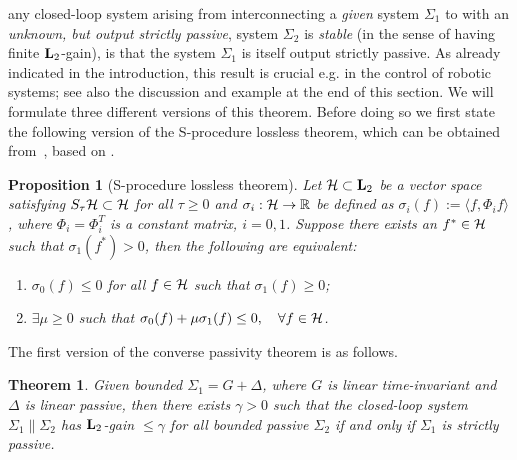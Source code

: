 \documentclass[11pt]{article}
\newtheorem{thm}[lemma]{Theorem}
\newtheorem{prop}[lemma]{Proposition}
\def\Real{\mathbb{R}} \def\Ints{\mathbb{Z}} \def\Natural{\mathbb{N}}
\newcommand{\Ltwo}{\boldsymbol{\rm L}_{2}}
\begin{document}
any closed-loop system arising from interconnecting a {\it given} system $\Sigma_1$ to with an {\it unknown, but output strictly passive}, system $\Sigma_2$ is {\it stable} (in the sense of having finite $\Ltwo$-gain), is that the system $\Sigma_1$ is itself output strictly passive. 
As already indicated in the introduction, this result is crucial e.g. in the control of robotic systems; see also the discussion and example at the end of this section.  We will formulate
three different versions of this theorem. Before doing so we first state the following version of the S-procedure lossless
theorem, which can be obtained from~\cite[Thm. 7 and Ex. 28]{Jon01}, based on \cite{MegTre93}.

\begin{prop}[S-procedure lossless theorem] \label{prop: Sprod} Let $\HH \subset \Ltwo$ be a vector space satisfying $S_\tau \mathcal{H} \subset \mathcal{H}$ for all
  $\tau \geq 0$ and $\sigma_i : \HH \to \Real$ be defined as $\sigma_i(f) := \langle f, \Phi_i f \rangle$, where $\Phi_i = \Phi_i^T$ is a constant
  matrix, $i = 0, 1$. Suppose there exists an $f^* \in \mathcal{H}$ such that $\sigma_1(f^*) > 0$, then the following are equivalent:
\begin{enumerate} \renewcommand{\theenumi}{\textup{(\roman{enumi})}}\renewcommand{\labelenumi}{\theenumi}
 \item $\sigma_0(f) \leq 0$ for all $f \in \mathcal{H}$ such that $\sigma_1(f) \geq 0$;

 \item $\exists \mu \geq 0$ such that $\sigma_0(f) + \mu \sigma_1(f) \leq 0, \quad \forall f \in \mathcal{H}$.
\end{enumerate}
\end{prop}

The first version of the converse passivity theorem is as follows.

\begin{thm} \label{thm: passive} Given bounded $\Sigma_1 = G + \Delta$, where $G$ is linear time-invariant and $\Delta$ is linear passive, then there
  exists $\gamma > 0$ such that the closed-loop system $\Sigma_1 \| \Sigma_2$ has $\Ltwo$-gain $\leq \gamma$ for {\it all} bounded passive $\Sigma_2$
  if and only if $\Sigma_1$ is strictly passive.
\end{thm}
\end{document}
